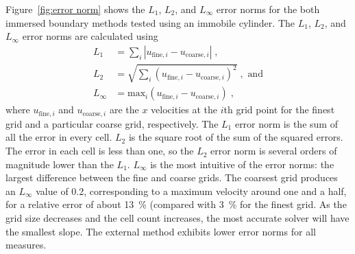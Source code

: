 \documentclass[preprint,12pt]{elsarticle}
\begin{document}
Figure~\ref{fig:error norm} shows the $L_1$, $L_2$, and $L_\infty$ error norms for
the both immersed boundary methods tested using an immobile cylinder.
The $L_1$, $L_2$, and $L_\infty$ error norms are calculated using
\begin{align}
    L_1 &= \sum_{i} \left|u_{\text{fine}, i}-u_{\text{coarse},i}\right| \;, \label{eq:L1 error norm} \\
    L_2 &= \sqrt{\sum_{i} \left(u_{\text{fine}, i}-u_{\text{coarse},i}\right)^2} \;, \text{ and} \label{eq:L2 error norm} \\
    L_{\infty} &= \text{max}_i\left(u_{\text{fine}, i}-u_{\text{coarse},i}\right) \;, \label{eq:Linf error norm}
\end{align}
where $ u_{\text{fine}, i} $ and $u_{\text{coarse}, i}$ are the $x$ velocities at the $i$th grid point
for the finest grid and a particular coarse grid, respectively.
The $L_1$ error norm is the sum of all the error in every cell.
$L_2$ is the square root of the sum of the squared errors. The error in each cell is less than one,
so the $L_2$ error norm is several orders of magnitude lower than the $L_1$.
$L_\infty$ is the most intuitive of the error norms: the largest difference between the
fine and coarse grids.
The coarsest grid produces an $L_\infty$ value of 0.2, corresponding to a maximum velocity
around one and a half, for a relative error of about \SI{13}{\percent} (compared with
\SI{3}{\percent} for the finest grid. As the grid size decreases and the cell count
increases, the most accurate solver will have the smallest slope.
The external method exhibits lower error norms for all measures.
\end{document}

